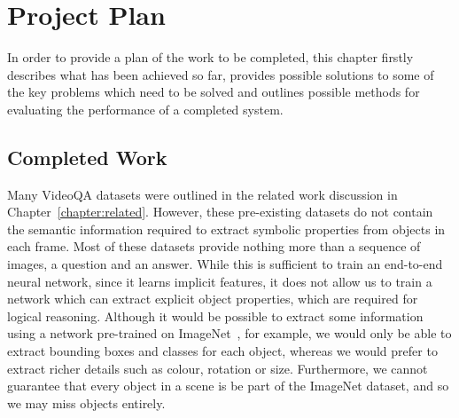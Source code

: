 \documentclass[../interim.tex]{subfiles}
\begin{document}
\chapter{Project Plan}

In order to provide a plan of the work to be completed, this chapter firstly describes what has been achieved so far, provides possible solutions to some of the key problems which need to be solved and outlines possible methods for evaluating the performance of a completed system.

\section{Completed Work}

Many VideoQA datasets were outlined in the related work discussion in Chapter~\ref{chapter:related}. However, these pre-existing datasets do not contain the semantic information required to extract symbolic properties from objects in each frame. Most of these datasets provide nothing more than a sequence of images, a question and an answer. While this is sufficient to train an end-to-end neural network, since it learns implicit features, it does not allow us to train a network which can extract explicit object properties, which are required for logical reasoning. Although it would be possible to extract some information using a network pre-trained on ImageNet~\cite{imagenet}, for example, we would only be able to extract bounding boxes and classes for each object, whereas we would prefer to extract richer details such as colour, rotation or size. Furthermore, we cannot guarantee that every object in a scene is be part of the ImageNet dataset, and so we may miss objects entirely.
\end{document}

